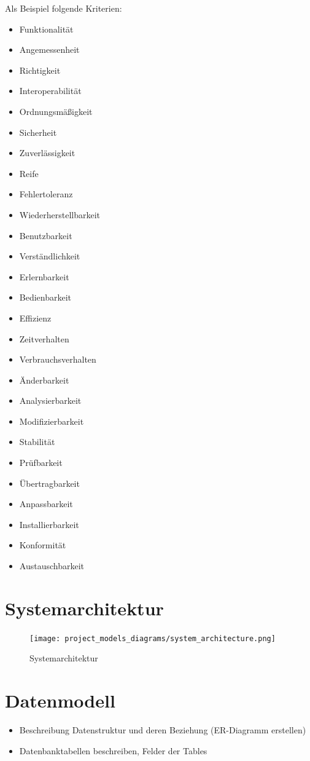 \documentclass[%
	12pt,
	a4paper,
	oneside,
	parskip=full
]{scrbook}
\begin{document}
Als Beispiel folgende Kriterien:

\begin{itemize}
	\item Funktionalität
	\item Angemessenheit
	\item Richtigkeit
	\item Interoperabilität
	\item Ordnungsmäßigkeit
	\item Sicherheit
	\item Zuverlässigkeit
	\item Reife
	\item Fehlertoleranz
	\item Wiederherstellbarkeit
	\item Benutzbarkeit
	\item Verständlichkeit
	\item Erlernbarkeit
	\item Bedienbarkeit
	\item Effizienz
	\item Zeitverhalten
	\item Verbrauchsverhalten
	\item Änderbarkeit
	\item Analysierbarkeit
	\item Modifizierbarkeit
	\item Stabilität
	\item Prüfbarkeit
	\item Übertragbarkeit
	\item Anpassbarkeit
	\item Installierbarkeit
	\item Konformität
	\item Austauschbarkeit
\end{itemize}

\chapter{Systemarchitektur}
\begin{figure}[ht]
	\centering
	\texttt{[image: project\_models\_diagrams/system\_architecture.png]}
	\caption{Systemarchitektur}
\end{figure}

\chapter{Datenmodell}
\begin{itemize}
	\item Beschreibung Datenstruktur und deren Beziehung (ER-Diagramm erstellen)
	\item Datenbanktabellen beschreiben, Felder der Tables
\end{itemize}
\end{document}
